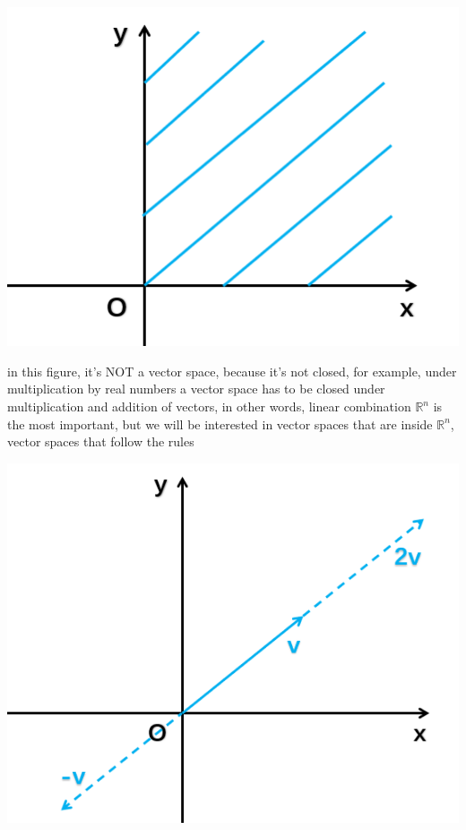 \documentclass[12pt, a4paper]{article}
\begin{document}
{\begin{center}
	\includegraphics[scale=0.5]{figures/S5-1.png}
\end{center}
in this figure, it's NOT a vector space, because it's not closed, for example, under multiplication by real numbers
\vspace{14pt}
\newline
{\textcolor{anhao-scarlet}{a vector space has to be closed under}} multiplication and addition of vectors, in other words, {\textcolor{anhao-scarlet}{linear combination}}
\vspace{14pt}
\newline
$\mathbb{R}^n$ is the most important, but we will be interested in vector spaces that are inside $\mathbb{R}^n$, vector spaces that follow the rules
\begin{center}
	\includegraphics[scale=0.5]{figures/S5-2.png}

\end{center}}
\end{document}
